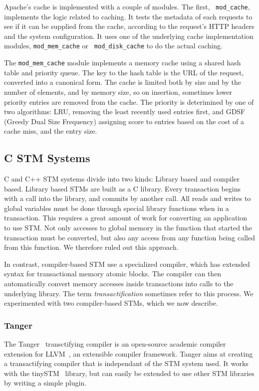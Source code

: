 \documentclass[preprint,11pt]{sigplanconf}
\let \cite = \citep
\begin{document}
Apache's cache is implemented with a couple of modules. The first, {\tt
mod\_cache}, implements the logic related to caching. It tests the metadata of
each requests to see if it can be supplied from the cache, according to the
request's HTTP headers and the system configuration. It uses one of the
underlying cache implementation modules, {\tt mod\_mem\_cache} or {\tt
mod\_disk\_cache} to do the actual caching.

The {\tt mod\_mem\_cache} module implements a memory cache using a shared hash
table and priority queue. The key to the hash table is the URL of the request,
converted into a canonical form. The cache is limited both by size and by the
number of elements, and by memory size, so on insertion, sometimes lower
priority entries are removed from the cache. The priority is deterimined by one
of two algorithms: LRU, removing the least recently used entries first, and GDSF
(Greedy Dual Size Frequency) assigning score to entries based on the cost of a
cache miss, and the entry size.

\subsection{C STM Systems}

C and C++ STM systems divide into two kinds: Library based and compiler based.
Library based STMs \cite{TL2,felber2008tinystm,RSTM} are built as a C library.
Every transaction begins with a call into the library, and commits by another
call. All reads and writes to global variables must be done through special
library functions when in a transaction. This requires a great amount of work
for converting an application to use STM. Not only accesses to global memory in
the function that started the transaction must be converted, but also any access
from any function being called from this function. We therefore ruled out
this approach. 

In contrast, compiler-based STM
\cite{felber2007tanger,icc,gcctm,baek:opentm:pact:2007} use a specialized
compiler, which has extended syntax for transactional memory atomic blocks. The
compiler can then automatically convert memory accesses inside transactions
into calls to the underlying library. The term \emph{transactification}
sometimes refer to this process. We experimented with two compiler-based
STMs, which we now describe. 

\subsubsection{\sc Tanger}
The {\sc Tanger}~\cite{felber2007tanger} transctifying compiler is an
open-source academic compiler extension for LLVM~\cite{LLVM:CGO04}, an
extensible compiler framework.  Tanger aims at creating a transactifying
compiler that is independant of the STM system used. It works with the
tinySTM~\cite{felber2008tinystm} library, but can easily be extended to use
other STM libraries by writing a simple plugin.
\end{document}
